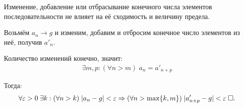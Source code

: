 \documentclass{article}
\begin{document}
\pagebreak

\theorem

Изменение, добавление или отбрасывание конечного числа элементов последовательности не влияет на её сходимость и величину предела.

\proof

Возьмём $a_{n}\to g$ и изменим, добавим и отбросим конечное число элементов из неё, получив $a'_{n}$.

Количество изменений конечно, значит:
\begin{align*}
	\exists m,p:(\forall n>m)\;a_{n}=a'_{n+p}
\end{align*}

Тогда:
\begin{align*}
	\forall\varepsilon>0\;\exists k:(\forall n>k)\;|a_{n}-g|<\varepsilon\Rightarrow(\forall n>\max\{k,m\})\;|a'_{n+p}-g|<\varepsilon\;\square.
\end{align*}
\end{document}
